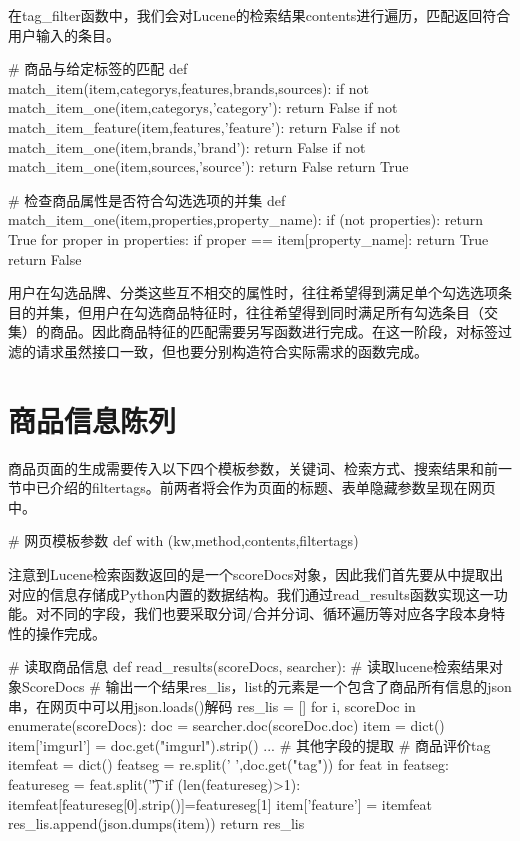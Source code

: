 在tag\_filter函数中，我们会对Lucene的检索结果contents进行遍历，匹配返回符合用户输入的条目。

\begin{python}
# 商品与给定标签的匹配
def match_item(item,categorys,features,brands,sources):
    if not match_item_one(item,categorys,'category'):
        return False
    if not match_item_feature(item,features,'feature'):
        return False
    if not match_item_one(item,brands,'brand'):
        return False
    if not match_item_one(item,sources,'source'):
        return False
    return True

# 检查商品属性是否符合勾选选项的并集
def match_item_one(item,properties,property_name):
    if (not properties):
        return True
    for proper in properties:
        if proper == item[property_name]:
            return True
    return False
\end{python}

用户在勾选品牌、分类这些互不相交的属性时，往往希望得到满足单个勾选选项条目的并集，但用户在勾选商品特征时，往往希望得到同时满足所有勾选条目（交集）的商品。因此商品特征的匹配需要另写函数进行完成。在这一阶段，对标签过滤的请求虽然接口一致，但也要分别构造符合实际需求的函数完成。

\section{商品信息陈列}

商品页面的生成需要传入以下四个模板参数，关键词、检索方式、搜索结果和前一节中已介绍的filtertags。前两者将会作为页面的标题、表单隐藏参数呈现在网页中。

\begin{python}
# 网页模板参数
def with (kw,method,contents,filtertags)
\end{python}

注意到Lucene检索函数返回的是一个scoreDocs对象，因此我们首先要从中提取出对应的信息存储成Python内置的数据结构。我们通过read\_results函数实现这一功能。对不同的字段，我们也要采取分词/合并分词、循环遍历等对应各字段本身特性的操作完成。

\begin{python}
# 读取商品信息
def read_results(scoreDocs, searcher):
    # 读取lucene检索结果对象ScoreDocs
    # 输出一个结果res_lis，list的元素是一个包含了商品所有信息的json串，在网页中可以用json.loads()解码
    res_lis = []
    for i, scoreDoc in enumerate(scoreDocs):
        doc = searcher.doc(scoreDoc.doc)
        item = dict()
        item['imgurl'] = doc.get("imgurl").strip()
        ... # 其他字段的提取
        # 商品评价tag
        itemfeat = dict()
        featseg = re.split(' ',doc.get("tag"))
        for feat in featseg:
            featureseg = feat.split('\t')
            if (len(featureseg)>1):
                itemfeat[featureseg[0].strip()]=featureseg[1]
        item['feature'] = itemfeat
        res_lis.append(json.dumps(item))
    return res_lis
\end{python}

